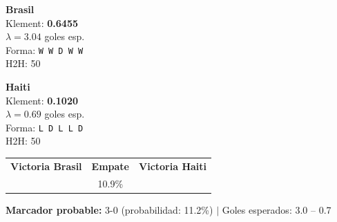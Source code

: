 \documentclass[11pt,a4paper]{article}
\begin{document}
\begin{tcolorbox}[colback=green!5, colframe=green!60!black, arc=5pt, 
  title={\textbf{Grupo C: Brasil \textbf{vs} Haiti}}]

\begin{minipage}{0.48\textwidth}
  \centering
  {\Large\bfseries Brasil}\\[3pt]
  Klement: \textbf{0.6455} \\
  $\lambda = 3.04$ goles esp. \\
  Forma: \texttt{W W D W W}\\ 
  H2H: 50%
\end{minipage}
\hfill
\begin{minipage}{0.04\textwidth}
\end{minipage}
\hfill
\begin{minipage}{0.48\textwidth}
  \centering
  {\Large\bfseries Haiti}\\[3pt]
  Klement: \textbf{0.1020} \\
  $\lambda = 0.69$ goles esp. \\
  Forma: \texttt{L D L L D}\\ 
  H2H: 50%
\end{minipage}

\vspace{0.4cm}
\centering
\begin{tabular}{ccc}
  \textbf{Victoria Brasil} & \textbf{Empate} & \textbf{Victoria Haiti} \\[3pt]
  \cellcolor{green!25}{\LARGE\bfseries 83.6\%}
  & {\LARGE 10.9\%}
  & \cellcolor{red!25}{\LARGE\bfseries 5.5\%} \\
\end{tabular}

\vspace{0.3cm}
\textbf{Marcador probable:} 3-0 (probabilidad: 11.2\%)
\quad $|$ \quad Goles esperados: 3.0 -- 0.7
\end{tcolorbox}
\end{document}
